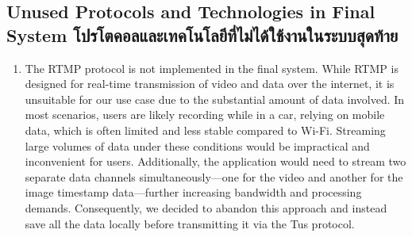 \subsection{\ifenglish Unused Protocols and Technologies in Final System \else โปรโตคอลและเทคโนโลยีที่ไม่ได้ใช้งานในระบบสุดท้าย \fi}
\begin{enumerate}
    \item The RTMP protocol is not implemented in the final system. While RTMP is designed for real-time transmission of video and data over the internet, it is unsuitable for our use case due to the substantial amount of data involved. In most scenarios, users are likely recording while in a car, relying on mobile data, which is often limited and less stable compared to Wi-Fi. Streaming large volumes of data under these conditions would be impractical and inconvenient for users. Additionally, the application would need to stream two separate data channels simultaneously—one for the video and another for the image timestamp data—further increasing bandwidth and processing demands. Consequently, we decided to abandon this approach and instead save all the data locally before transmitting it via the Tus protocol.
\end{enumerate}